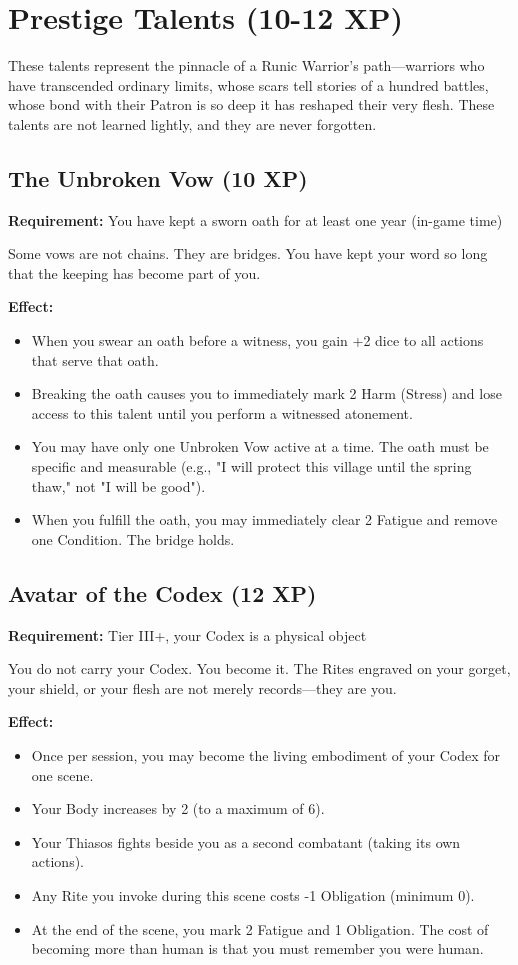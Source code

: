 \section{Prestige Talents (10-12 XP)}

These talents represent the pinnacle of a Runic Warrior's path—warriors who have transcended ordinary limits, whose scars tell stories of a hundred battles, whose bond with their Patron is so deep it has reshaped their very flesh. These talents are not learned lightly, and they are never forgotten.

\subsection{The Unbroken Vow (10 XP)}

\textbf{Requirement:} You have kept a sworn oath for at least one year (in-game time)

Some vows are not chains. They are bridges. You have kept your word so long that the keeping has become part of you.

\textbf{Effect:}
\begin{itemize}
\item When you swear an oath before a witness, you gain +2 dice to all actions that serve that oath.
\item Breaking the oath causes you to immediately mark 2 Harm (Stress) and lose access to this talent until you perform a witnessed atonement.
\item You may have only one Unbroken Vow active at a time. The oath must be specific and measurable (e.g., "I will protect this village until the spring thaw," not "I will be good").
\item When you fulfill the oath, you may immediately clear 2 Fatigue and remove one Condition. The bridge holds.
\end{itemize}

\subsection{Avatar of the Codex (12 XP)}

\textbf{Requirement:} Tier III+, your Codex is a physical object

You do not carry your Codex. You become it. The Rites engraved on your gorget, your shield, or your flesh are not merely records—they are you.

\textbf{Effect:}
\begin{itemize}
\item Once per session, you may become the living embodiment of your Codex for one scene.
\item Your Body increases by 2 (to a maximum of 6).
\item Your Thiasos fights beside you as a second combatant (taking its own actions).
\item Any Rite you invoke during this scene costs -1 Obligation (minimum 0).
\item At the end of the scene, you mark 2 Fatigue and 1 Obligation. The cost of becoming more than human is that you must remember you were human.
\end{itemize}

